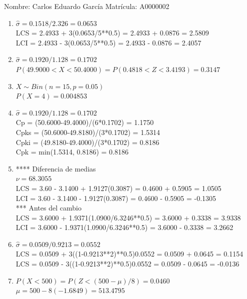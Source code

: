 \documentclass[8pt]{report}
\begin{document}
 \newpage

Nombre: \underline{\hspace*{.2in}}
Carlos Eduardo García
\underline{\hspace*{.2in}} \quad Matr\'icula:\underline{\hspace*{.2in}}
A0000002
\underline{\hspace*{.2in}} \\

\begin{enumerate}
\item $\hat\sigma = 0.1518/2.326 = 0.0653$\\
LCS = 2.4933 + 3(0.0653/5**0.5) = 2.4933 + 0.0876 = 2.5809\\
LCI = 2.4933 - 3(0.0653/5**0.5) = 2.4933 - 0.0876 = 2.4057
\item $\hat\sigma = 0.1920/1.128 = 0.1702$\\
$P(49.9000 < X < 50.4000) = P(0.4818 < Z < 3.4193) = 0.3147$\\
\item $X \sim Bin(n=15, p=0.05)$\\
$P(X = 4) = 0.004853$
\item $\hat\sigma = 0.1920/1.128 = 0.1702$\\
Cp = (50.6000-49.4000)/(6*0.1702) = 1.1750\\
Cpks = (50.6000-49.8180)/(3*0.1702) = 1.5314\\
Cpki = (49.8180-49.4000)/(3*0.1702) = 0.8186\\
Cpk = min(1.5314, 0.8186) = 0.8186
\item **** Diferencia de medias\\
$\nu = 68.3055$\\
LCS = 3.60 - 3.1400 + 1.9127(0.3087) = 0.4600 + 0.5905 = 1.0505\\
LCI = 3.60 - 3.1400 - 1.9127(0.3087) = 0.4600 - 0.5905 = -0.1305\\
*** Antes del cambio\\
LCS = 3.6000 + 1.9371(1.0900/6.3246**0.5) = 3.6000 + 0.3338 = 3.9338\\
LCI = 3.6000 - 1.9371(1.0900/6.3246**0.5) = 3.6000 - 0.3338 = 3.2662\\
\item $\hat\sigma = 0.0509/0.9213 = 0.0552$\\
LCS = 0.0509 + 3((1-0.9213**2)**0.5)0.0552 = 0.0509 + 0.0645 = 0.1154\\
LCS = 0.0509 - 3((1-0.9213**2)**0.5)0.0552 = 0.0509 - 0.0645 = -0.0136
\item $P(X < 500) = P(Z < (500-\mu)/8) = 0.0460$\\
$\mu = 500 - 8(-1.6849) = 513.4795$\\
\end{enumerate}
\end{document}
